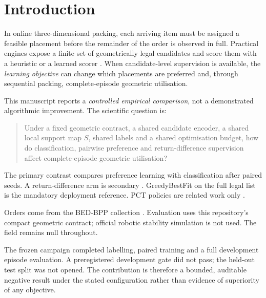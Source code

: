 \section{Introduction}

In online three-dimensional packing, each arriving item must be assigned a
feasible placement before the remainder of the order is observed in full.
Practical engines expose a finite set of geometrically legal candidates and score
them with a heuristic or a learned scorer
\citep{crainic2008extreme,zhao2022pct}. When candidate-level supervision is
available, the \emph{learning objective} can change which placements are preferred
and, through sequential packing, complete-episode geometric utilisation.

This manuscript reports a \emph{controlled empirical comparison}, not a
demonstrated algorithmic improvement. The scientific question is:
\begin{quote}
Under a fixed geometric contract, a shared candidate encoder, a shared local
support map $S$, shared labels and a shared optimisation budget, how do
classification, pairwise preference and return-difference supervision affect
complete-episode geometric utilisation?
\end{quote}
The primary contrast compares preference learning with classification after paired
seeds. A return-difference arm is secondary \citep{mandi2022decision}.
GreedyBestFit on the full legal list is the mandatory deployment reference.
PCT policies are related work only \citep{zhao2022pct}.

Orders come from the BED-BPP collection \citep{kagerer2023bedbpp}. Evaluation uses
this repository's compact geometric contract; official robotic stability simulation
is not used. The field  remains null throughout.

The frozen campaign completed labelling, paired training and a full development
episode evaluation. A preregistered development gate did not pass; the held-out
test split was not opened. The contribution is therefore a bounded, auditable
negative result under the stated configuration rather than evidence of superiority
of any objective.
